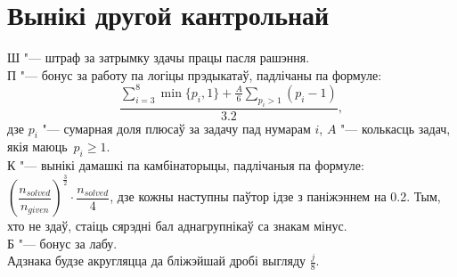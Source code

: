 

\geometry{left=0.8cm}


    \section{Вынікі другой кантрольнай}
    \noindent Ш "--- штраф за затрымку здачы працы пасля рашэння. \\
    П "--- бонус за работу па логіцы прэдыкатаў, падлічаны па формуле:
    $$\dfrac{\sum \limits _{i=3} ^8 \min\{p_i, 1\} + \frac{A}{6} \sum \limits _{p_i > 1} (p_i - 1)}{3.2},$$
    дзе $p_i$ "--- сумарная доля плюсаў за задачу пад нумарам $i$, $A$ "--- колькасць задач, якія маюць~$p_i \geqslant 1$. \\
    К "--- вынікі дамашкі па камбінаторыцы, падлічаныя  па формуле: $\left(\dfrac{n_{solved}}{n_{given}}\right) ^{\frac{3}{2}} \cdot \dfrac{n_{solved}}{4}$, дзе кожны наступны паўтор ідзе з паніжэннем на 0.2. Тым, хто не здаў, стаіць сярэдні бал аднагрупнікаў са знакам мінус.\\
    Б "--- бонус за лабу. \\
    Адзнака будзе акругляцца да бліжэйшай дробі выгляду $\frac{j}{8}$.
